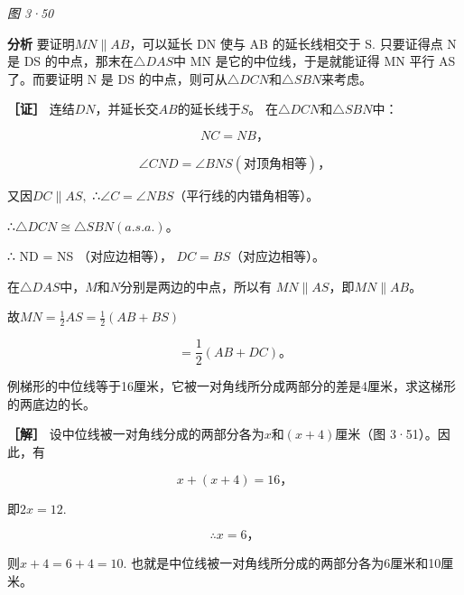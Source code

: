\emph{图 3·50}

\textbf{分析} 要证明\(MN \parallel AB\)，可以延长 DN 使与 AB
的延长线相交于 S. 只要证得点 N 是 DS 的中点，那末在\(\triangle DAS\)中
MN 是它的中位线，于是就能证得 MN 平行 AS 了。而要证明 N 是 DS
的中点，则可从\(\triangle DCN\)和\(\triangle SBN\)来考虑。

\textbf{［证］} 连结\(DN\)，并延长交\(AB\)的延长线于\(S\)。
在\(\triangle DCN\)和\(\triangle SBN\)中：

\[
NC = NB\text{，}
\]

\[
\angle CND = \angle BNS (\text{对顶角相等})\text{，}
\]

又因\(DC \parallel AS,\)
∴\(\angle C = \angle NBS\)（平行线的内错角相等）。

∴\(\triangle DCN \cong \triangle SBN (a.s.a.)\)。

∴ ND = NS （对应边相等）， \(DC = BS\)（对应边相等）。

在\(\triangle DAS\)中，\(M\)和\(N\)分别是两边的中点，所以有
\(MN \parallel AS\)，即\(MN \parallel AB\)。

故\(MN = \frac{1}{2} AS = \frac{1}{2}(AB + BS)\)

\[
= \frac{1}{2} (AB + DC)\text{。}
\]

例梯形的中位线等于16厘米，它被一对角线所分成两部分的差是4厘米，求这梯形的两底边的长。

\textbf{［解］}
设中位线被一对角线分成的两部分各为\(x\)和\((x + 4)\)厘米（图
3·51）。因此，有

\[
x + (x + 4) = 16\text{，}
\]

即\(2x = 12.\)

\[
\therefore x = 6\text{，}
\]

则\(x + 4 = 6 + 4 = 10.\)
也就是中位线被一对角线所分成的两部分各为6厘米和10厘米。

